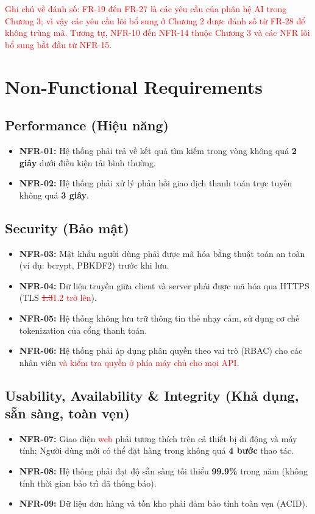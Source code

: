 \documentclass[12pt,a4paper,oneside]{report}
\newif\ifmark \marktrue
\newcommand{\chg}[1]{\ifmark\textcolor{red}{#1}\else #1\fi}
\newcommand{\del}[1]{\ifmark\textcolor{red}{\sout{#1}}\fi}
\begin{document}
\chg{Ghi chú về đánh số: FR-19 đến FR-27 là các yêu cầu của phân hệ AI trong Chương 3; vì vậy các yêu cầu lõi bổ sung ở Chương 2 được đánh số từ FR-28 để không trùng mã. Tương tự, NFR-10 đến NFR-14 thuộc Chương 3 và các NFR lõi bổ sung bắt đầu từ NFR-15.}

\section{Non-Functional Requirements}

\subsection{Performance (Hiệu năng)}

\begin{itemize}
  \item \textbf{NFR-01:} Hệ thống phải trả về kết quả tìm kiếm trong vòng không quá \textbf{2 giây} dưới điều kiện tải bình thường.
  \item \textbf{NFR-02:} Hệ thống phải xử lý phản hồi giao dịch thanh toán trực tuyến không quá \textbf{3 giây}.
\end{itemize}

\subsection{Security (Bảo mật)}

\begin{itemize}
  \item \textbf{NFR-03:} Mật khẩu người dùng phải được mã hóa bằng thuật toán an toàn (ví dụ: bcrypt, PBKDF2) trước khi lưu.
  \item \textbf{NFR-04:} Dữ liệu truyền giữa client và server phải được mã hóa qua HTTPS (TLS \del{1.3}\chg{1.2 trở lên}).
  \item \textbf{NFR-05:} Hệ thống không lưu trữ thông tin thẻ nhạy cảm, sử dụng cơ chế tokenization của cổng thanh toán.
  \item \textbf{NFR-06:} Hệ thống phải áp dụng phân quyền theo vai trò (RBAC) cho các nhân viên\chg{ và kiểm tra quyền ở phía máy chủ cho mọi API}.
\end{itemize}

\subsection{Usability, Availability \& Integrity (Khả dụng, sẵn sàng, toàn vẹn)}

\begin{itemize}
  \item \textbf{NFR-07:} Giao diện \chg{web }phải tương thích trên cả thiết bị di động và máy tính; Người dùng mới có thể đặt hàng trong không quá \textbf{4 bước} thao tác.
  \item \textbf{NFR-08:} Hệ thống phải đạt độ sẵn sàng tối thiểu \textbf{99.9\%} trong năm (không tính thời gian bảo trì đã thông báo).
  \item \textbf{NFR-09:} Dữ liệu đơn hàng và tồn kho phải đảm bảo tính toàn vẹn (ACID).
\end{itemize}
\end{document}
